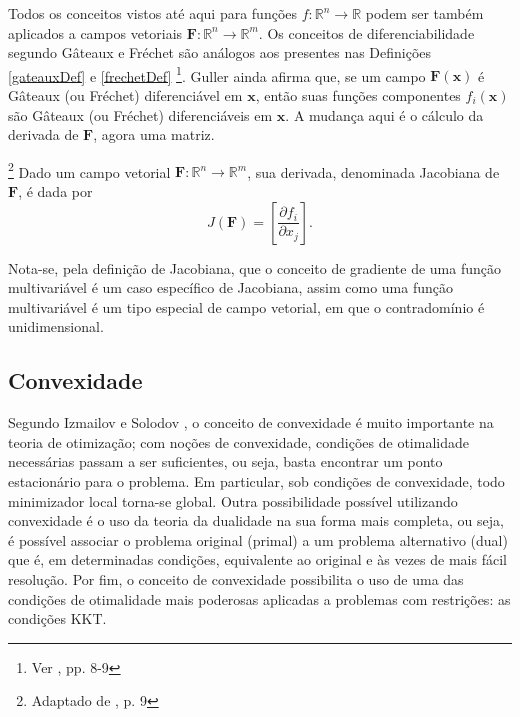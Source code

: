 Todos os conceitos vistos at\'{e} aqui para fun\c{c}\~{o}es $f: \mathbb{R}^{n} \to \mathbb{R}$ podem ser tamb\'{e}m aplicados a campos vetoriais $\mathbf{F}: \mathbb{R}^{n} \to \mathbb{R}^{m}$. Os conceitos de diferenciabilidade segundo G\^{a}teaux e Fr\'{e}chet s\~{a}o an\'{a}logos aos presentes nas Defini\c{c}\~{o}es \ref{gateauxDef} e \ref{frechetDef} \footnote{Ver \cite{guller}, pp. 8-9}. Guller ainda afirma que, se um campo $\mathbf{F}(\mathbf{x})$ \'{e} G\^{a}teaux (ou Fr\'{e}chet) diferenci\'{a}vel em $\mathbf{x}$, ent\~{a}o suas fun\c{c}\~{o}es componentes $f_i(\mathbf{x})$ s\~{a}o G\^{a}teaux (ou Fr\'{e}chet) diferenci\'{a}veis em $\mathbf{x}$. A mudan\c{c}a aqui \'{e} o c\'{a}lculo da derivada de $\mathbf{F}$, agora uma matriz.

\begin{definition}\footnote{Adaptado de \cite{guller}, p. 9}
Dado um campo vetorial $\mathbf{F}: \mathbb{R}^{n} \to \mathbb{R}^{m}$, sua derivada, denominada Jacobiana de $\mathbf{F}$, \'{e} dada por
\begin{equation}
J(\mathbf{F}) = \left[ \frac{\partial f_i}{\partial x_j} \right].
\end{equation}
\end{definition}

Nota-se, pela defini\c{c}\~{a}o de Jacobiana, que o conceito de gradiente de uma fun\c{c}\~{a}o multivari\'{a}vel \'{e} um caso espec\'{i}fico de Jacobiana, assim como uma fun\c{c}\~{a}o multivari\'{a}vel \'{e} um tipo especial de campo vetorial, em que o contradom\'{i}nio \'{e} unidimensional.

\subsection{Convexidade}
Segundo Izmailov e Solodov \cite{izmailov}, o conceito de convexidade \'{e} muito importante na teoria de otimiza\c{c}\~{a}o; com no\c{c}\~{o}es de convexidade, condi\c{c}\~{o}es de otimalidade necess\'{a}rias passam a ser suficientes, ou seja, basta encontrar um ponto estacion\'{a}rio para o problema. Em particular, sob condi\c{c}\~{o}es de convexidade, todo minimizador local torna-se global. Outra possibilidade poss\'{i}vel utilizando convexidade \'{e} o uso da teoria da dualidade na sua forma mais completa, ou seja, \'{e} poss\'{i}vel associar o problema original (primal) a um problema alternativo (dual) que \'{e}, em determinadas condi\c{c}\~{o}es, equivalente ao original e \`{a}s vezes de mais f\'{a}cil resolu\c{c}\~{a}o. Por fim, o conceito de convexidade possibilita o uso de uma das condi\c{c}\~{o}es de otimalidade mais poderosas aplicadas a problemas com restri\c{c}\~{o}es: as condi\c{c}\~{o}es KKT.

